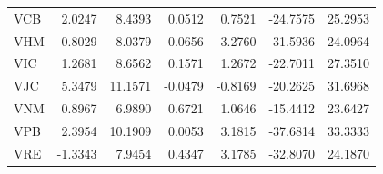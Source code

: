 \begin{table}[h]
\begin{tabular}{lrrrrrr}
VCB & 2.0247 & 8.4393 & 0.0512 & 0.7521 & -24.7575 & 25.2953 \\
VHM & -0.8029 & 8.0379 & 0.0656 & 3.2760 & -31.5936 & 24.0964 \\
VIC & 1.2681 & 8.6562 & 0.1571 & 1.2672 & -22.7011 & 27.3510 \\
VJC & 5.3479 & 11.1571 & -0.0479 & -0.8169 & -20.2625 & 31.6968 \\
VNM & 0.8967 & 6.9890 & 0.6721 & 1.0646 & -15.4412 & 23.6427 \\
VPB & 2.3954 & 10.1909 & 0.0053 & 3.1815 & -37.6814 & 33.3333 \\
VRE & -1.3343 & 7.9454 & 0.4347 & 3.1785 & -32.8070 & 24.1870 \\
\bottomrule
\end{tabular}
\end{table}
